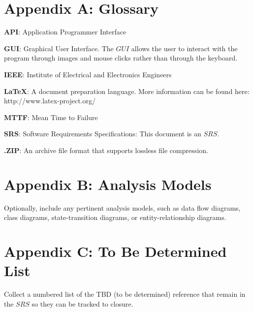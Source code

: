 \documentclass[a4paper, 12pt]{article}
\begin{document}
\section{Appendix A: Glossary} \label{appendixa}
\begin{adjustwidth}{1em}{0pt}
\textbf{API}: Application Programmer Interface \newline

\noindent \textbf{GUI}: Graphical User Interface. The $GUI$ allows the user to interact with the program through images and mouse clicks rather than through the keyboard. \newline

\noindent \textbf{IEEE}: Institute of Electrical and Electronics Engineers \newline

\noindent \textbf{LaTeX}: A document preparation language. More information can be found here: http://www.latex-project.org/ \newline

\noindent \textbf{MTTF}: Mean Time to Failure \newline

\noindent \textbf{SRS}: Software Requirements Specifications: This document is an $SRS$. \newline

\noindent \textbf{.ZIP}: An archive file format that supports lossless file compression. \newline
\end{adjustwidth}

\section{Appendix B: Analysis Models} \label{appexdixb}
\begin{adjustwidth}{1em}{0pt}
Optionally, include any pertinent analysis models, such as data flow diagrams, class diagrams, state-transition diagrams, or entity-relationship diagrams.
\end{adjustwidth}

\section{Appendix C: To Be Determined List} \label{appendixc}
\begin{adjustwidth}{1em}{0pt}
Collect a numbered list of the TBD (to be determined) reference that remain in the $SRS$ so they can be tracked to closure. 
\end{adjustwidth}
\end{document}
